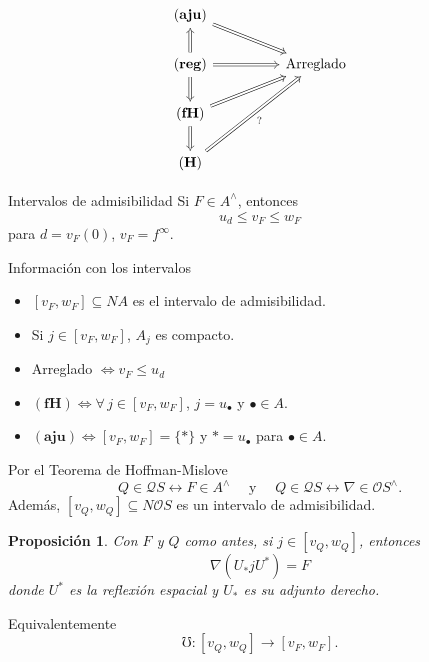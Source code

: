 \documentclass[compress,12pt]{beamer}
\newtheorem{prop}{Proposición}
\begin{document}
\begin{frame}[fragile]
\[\begin{tikzcd}
	{\mathbf{(aju)}} \\
	{\mathbf{(reg)}} && {\mbox{Arreglado}} \\
	{\mathbf{(fH)}} \\
	{\mathbf{(H)}}
	\arrow[Rightarrow, from=1-1, to=2-3]
	\arrow[Rightarrow, from=2-1, to=1-1]
	\arrow[Rightarrow, from=2-1, to=2-3]
	\arrow[Rightarrow, from=2-1, to=3-1]
	\arrow[Rightarrow, from=3-1, to=2-3]
	\arrow[Rightarrow, from=3-1, to=4-1]
	\arrow["{?}"', Rightarrow, from=4-1, to=2-3]
\end{tikzcd}\]
\end{frame}

\begin{frame}{Intervalos de admisibilidad}
Si $F\in A^\wedge$, entonces 
\[
u_d\leq v_F \leq  w_F
\] 
para $d=v_F(0)$, $v_F=f^\infty$.

\begin{block}{Información con los intervalos}
\begin{itemize}
\item $[v_F, w_F]\subseteq NA$ es el intervalo de admisibilidad.
\item Si $j\in [v_F,w_F]$, $A_j$ es compacto.
\item Arreglado $\Leftrightarrow v_F\leq u_d$
\item $\mathbf{(fH)}\Leftrightarrow\forall\, j\in [v_F,w_F]$, $j=u_\bullet$ y $\bullet\in A$.  
\item $\mathbf{(aju)}\Leftrightarrow [v_F,w_F]=\{*\}$ y $*=u_\bullet$ para $\bullet\in A$. 
\end{itemize}
\end{block}
\end{frame}

\begin{frame}
Por el Teorema de Hoffman-Mislove 
\[
Q\in \mathcal{Q}S\leftrightarrow F\in A^\wedge\quad \mbox{ y } \quad Q\in \mathcal{Q}S\leftrightarrow \nabla\in \mathcal{O}S^\wedge.
\]
Además, $[v_Q, w_Q]\subseteq N\mathcal{O}S$ es un intervalo de admisibilidad.

\begin{prop}
Con $F$ y $Q$ como antes, si $j\in [v_Q, w_Q]$, entonces 
\[
\nabla(U_*jU^*)=F
\]
donde $U^*$ es la reflexión espacial y $U_*$ es su adjunto derecho.
\end{prop}
Equivalentemente
\[
\mho\colon [v_Q, w_Q]\to [v_F, w_F].
\]
\end{frame}
\end{document}

